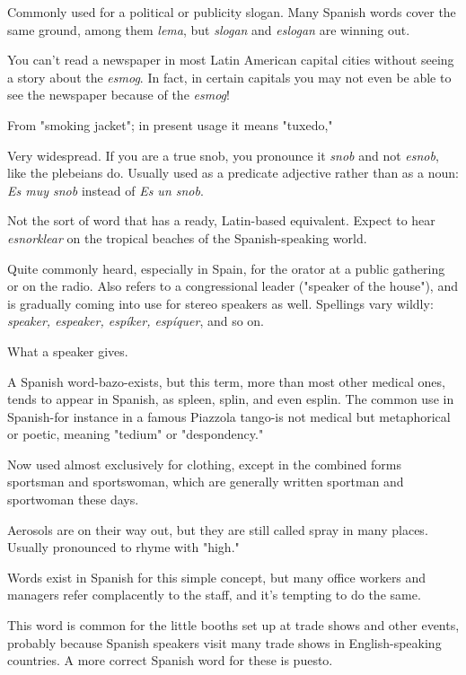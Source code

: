  Commonly used for a political or publicity slogan.
Many Spanish words cover the same ground, among them \emph{lema}, but
\emph{slogan} and \emph{eslogan} are winning out.

 You can't read a newspaper in most Latin American
capital cities without seeing a story about the \emph{esmog}. In fact, in certain capitals you may not even be able to see the newspaper because
of the \emph{esmog}!

 From "smoking jacket"; in present usage it means
"tuxedo,"

 Very widespread. If you are a true snob, you pronounce
it \emph{snob} and not \emph{esnob}, like the plebeians do. Usually used as a predicate
adjective rather than as a noun: \emph{Es muy snob} instead of \emph{Es un snob}.

 Not the sort of word that has a ready, Latin-based
equivalent. Expect to hear \emph{esnorklear} on the tropical beaches of the
Spanish-speaking world.

 Quite commonly heard, especially in Spain, for
the orator at a public gathering or on the radio. Also refers to a congressional leader ("speaker of the house"), and is gradually coming
into use for stereo speakers as well. Spellings vary wildly: \emph{speaker,
espeaker, espíker, espíquer}, and so on.

 What a speaker gives.

 A Spanish word-bazo-exists, but this term, more
than most other medical ones, tends to appear in Spanish, as spleen,
splin, and even esplin. The common use in Spanish-for instance in
a famous Piazzola tango-is not medical but metaphorical or poetic,
meaning "tedium" or "despondency."

 Now used almost exclusively for clothing, except in
the combined forms sportsman and sportswoman, which are generally
written sportman and sportwoman these days.

 Aerosols are on their way out, but they are still called
spray in many places. Usually pronounced to rhyme with "high."

 Words exist in Spanish for this simple concept, but
many office workers and managers refer complacently to the staff, and
it's tempting to do the same.

 This word is common for the little booths set up at
trade shows and other events, probably because Spanish speakers visit
many trade shows in English-speaking countries. A more correct Spanish word for these is puesto.

